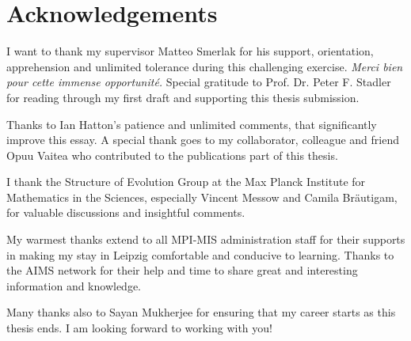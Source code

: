 



\bigskip

\begingroup
\let\clearpage\relax
\let\cleardoublepage\relax
\let\cleardoublepage\relax
\chapter*{Acknowledgements}
I want to thank my supervisor Matteo Smerlak for his support, orientation, apprehension and unlimited tolerance during this challenging exercise. \textit{Merci bien pour cette immense opportunité.}
Special gratitude to Prof$.$ Dr$.$ Peter F. Stadler for reading through my first draft and supporting this thesis submission. 

Thanks to Ian Hatton's patience and unlimited comments, that significantly improve this essay. A special thank goes to my collaborator, colleague and friend Opuu Vaitea who contributed to the publications part of this thesis. 

I thank the Structure of Evolution Group at the Max Planck Institute for Mathematics in the Sciences, especially Vincent Messow and Camila Bräutigam, for valuable discussions and insightful comments. 

My warmest thanks extend to all MPI-MIS administration staff for their supports in making my stay in Leipzig comfortable and conducive to learning. Thanks to the AIMS network for their help and time to share great and interesting information and knowledge. 

Many thanks also to Sayan Mukherjee for ensuring that my career starts as this thesis ends. I am looking forward to working with you!

